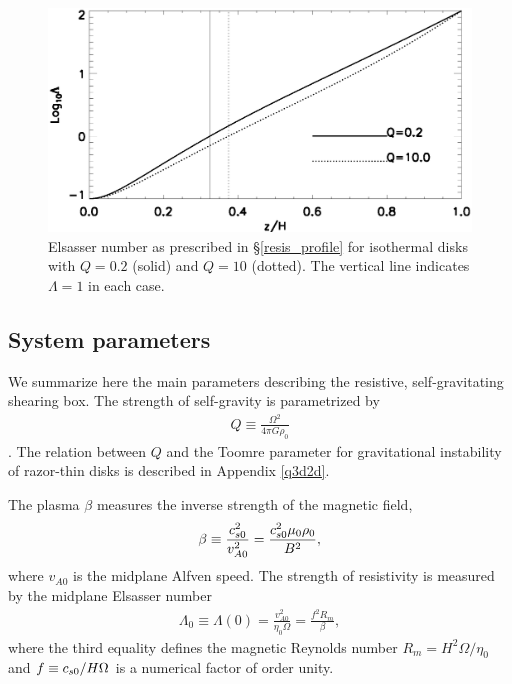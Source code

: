 \begin{figure}
  \includegraphics[width=\linewidth]{figures/elsasser_iso}
  \caption{Elsasser number as prescribed in \S\ref{resis_profile} for
    isothermal disks with $Q=0.2$ (solid) 
    and $Q=10$ (dotted). The vertical line
    indicates $\Lambda=1$ in each case. \label{eqm_resis}}
\end{figure}


\subsection{System parameters}
We summarize here the main parameters describing the resistive,
self-gravitating shearing box. The strength of self-gravity is
parametrized by 
\begin{align}
  Q \equiv \frac{\Omega^2}{4\pi G\rho_0}
\end{align}
\citep{mamat10}. The relation between $Q$ and the Toomre 
parameter for gravitational instability of razor-thin disks is
described in Appendix \ref{q3d2d}.


The plasma $\beta$ measures the inverse strength of
the magnetic field,
\begin{align}
  \beta \equiv \frac{c_{s0}^2}{v_{A0}^2} =
  \frac{c_{s0}^2\mu_0\rho_0}{B^2},  
\end{align}
where $v_{A0}$ is the midplane Alfven speed. The strength of
resistivity is measured by the midplane Elsasser number 
\begin{align}
  \Lambda_0 \equiv\Lambda(0) =  \frac{v_{A0}^2}{\eta_0\Omega} = \frac{f^2 R_m}{\beta}, 
\end{align}
where the third equality defines the magnetic Reynolds number
$R_m=H^2\Omega/\eta_0$ and $f\equiv c_{s0}/H\Omega$ is a numerical
factor of order unity. 




